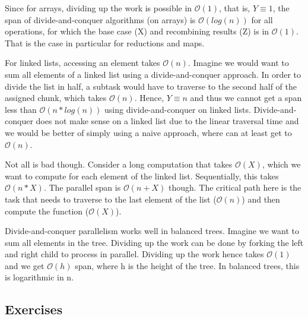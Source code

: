 \documentclass[main.tex]{subfiles}
\begin{document}
Since for arrays, dividing up the work is possible in \(\mathcal{O}(1)\), that is, \(Y\equiv 1\), the span of divide-and-conquer algorithms (on arrays) is \(\mathcal{O}(log(n))\) for all operations, for which the base case (X) and recombining results (Z) is in \(\mathcal{O}(1)\). That is the case in particular for reductions and maps.

For linked lists, accessing an element takes \(\mathcal{O}(n)\). Imagine we would want to sum all elements of a linked list using a divide-and-conquer approach. In order to divide the list in half, a subtask would have to traverse to the second half of the assigned chunk, which takes \(\mathcal{O}(n)\). Hence, \(Y\equiv n\) and thus we cannot get a span less than \(\mathcal{O}(n*log(n))\) using divide-and-conquer on linked lists. Divide-and-conquer does not make sense on a linked list due to the linear traversal time and we would be better of simply using a naive approach, where can at least get to \(\mathcal{O}(n)\).

Not all is bad though. Consider a long computation that takes \(\mathcal{O}(X)\), which we want to compute for each element of the linked list. Sequentially, this takes \(\mathcal{O}(n*X)\). The parallel span is \(\mathcal{O}(n + X)\) though. The critical path here is the task that needs to traverse to the last element of the list (\(\mathcal{O}(n)\)) and then compute the function (\(\mathcal{O}(X)\)).

Divide-and-conquer parallelism works well in balanced trees. Imagine we want to sum all elements in the tree. Dividing up the work can be done by forking the left and right child to process in parallel. Dividing up the work hence takes \(\mathcal{O}(1)\) and we get \(\mathcal{O}(h)\) span, where h is the height of the tree. In balanced trees, this is logarithmic in n.

\newpage

\subsection{Exercises}
\end{document}
